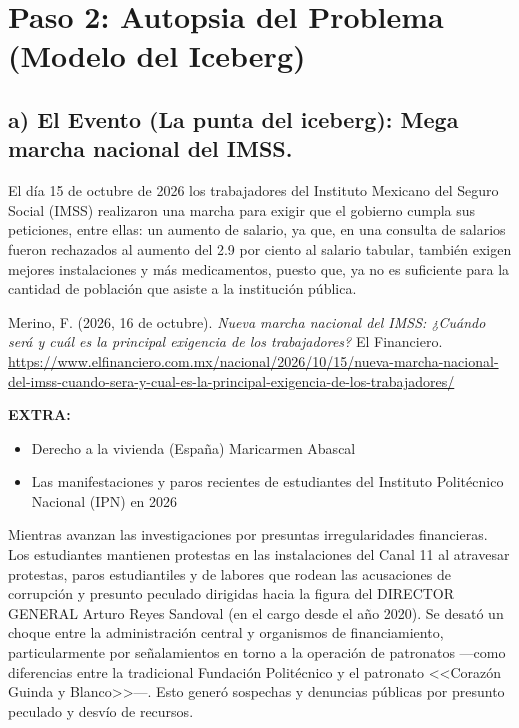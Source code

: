 \documentclass[12pt,letterpaper]{article}
\begin{document}
\section*{Paso 2: Autopsia del Problema (Modelo del Iceberg)}

\subsection*{a) El Evento (La punta del iceberg): Mega marcha nacional del IMSS.}

El día 15 de octubre de 2026 los trabajadores del Instituto Mexicano del Seguro Social (IMSS) realizaron una marcha para exigir que el gobierno cumpla sus peticiones, entre ellas: un aumento de salario, ya que, en una consulta de salarios fueron rechazados al aumento del 2.9 por ciento al salario tabular, también exigen mejores instalaciones y más medicamentos, puesto que, ya no es suficiente para la cantidad de población que asiste a la institución pública.

Merino, F. (2026, 16 de octubre). \textit{Nueva marcha nacional del IMSS: ¿Cuándo será y cuál es la principal exigencia de los trabajadores?} El Financiero. \url{https://www.elfinanciero.com.mx/nacional/2026/10/15/nueva-marcha-nacional-del-imss-cuando-sera-y-cual-es-la-principal-exigencia-de-los-trabajadores/}

\textbf{EXTRA:}
\begin{itemize}
  \item Derecho a la vivienda (España) Maricarmen Abascal
  \item Las manifestaciones y paros recientes de estudiantes del Instituto Politécnico Nacional (IPN) en 2026
\end{itemize}

Mientras avanzan las investigaciones por presuntas irregularidades financieras. Los estudiantes mantienen protestas en las instalaciones del Canal 11 al atravesar protestas, paros estudiantiles y de labores que rodean las acusaciones de corrupción y presunto peculado dirigidas hacia la figura del DIRECTOR GENERAL Arturo Reyes Sandoval (en el cargo desde el año 2020). Se desató un choque entre la administración central y organismos de financiamiento, particularmente por señalamientos en torno a la operación de patronatos ---como diferencias entre la tradicional Fundación Politécnico y el patronato <<Corazón Guinda y Blanco>>---. Esto generó sospechas y denuncias públicas por presunto peculado y desvío de recursos.
\end{document}
